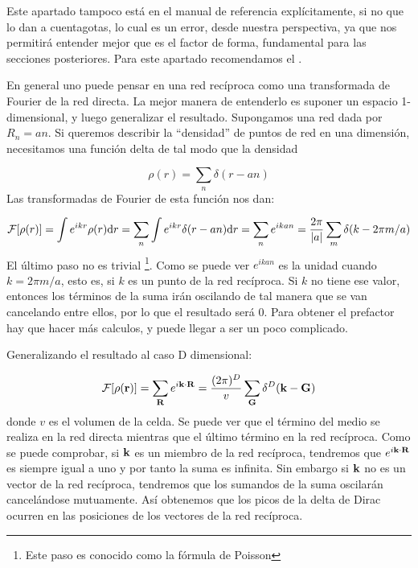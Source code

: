 Este apartado tampoco está en el manual de referencia \cite{Fisica_del_Estado_Solido} explícitamente, si no que lo dan a cuentagotas, lo cual es un error, desde nuestra perspectiva, ya que nos permitirá entender mejor que es el factor de forma, fundamental para las secciones posteriores. Para este apartado recomendamos el \cite{Oxford_Solid_State}.

En general uno puede pensar en una red recíproca como una transformada de Fourier de la red directa. La mejor manera de entenderlo es suponer un espacio 1-dimensional, y luego generalizar el resultado. Supongamos una red dada por $R_n=an$. Si queremos describir la ``densidad'' de puntos de red en una dimensión, necesitamos una función delta de tal modo que la densidad

\begin{equation}
	\rho (r) = \sum_n \delta (r-an) 
\end{equation}
Las transformadas de Fourier de esta función nos dan:

\begin{equation}
	\mathcal{F} [\rho(r)] = \int e^{ikr} \rho (r) \mathrm{d} r =  \sum_{n} \int e^{ikr} \delta (r-an) \mathrm{d} r =  \sum_n e^{ikan} = \frac{2\pi}{|a|} \sum_m \delta (k - 2\pi m/a)
\end{equation}
El último paso no es trivial \footnote{Este paso es conocido como la fórmula de Poisson}. Como se puede ver $e^{ikan}$ es la unidad cuando $k=2\pi m/a$, esto es, si $k$ es un punto de la red recíproca. Si $k$ no tiene ese valor, entonces los términos de la suma irán oscilando de tal manera que se van cancelando entre ellos, por lo que el resultado será 0. Para obtener el prefactor hay que hacer más calculos, y puede llegar a ser un poco complicado.

Generalizando el resultado al caso D dimensional:

\begin{equation}
	\mathcal{F} [\rho(\mathbf{r})] = \sum_{\mathbf{R}} e^{i\mathbf{k} \cdot \mathbf{R}} = \frac{(2\pi)^D}{v} \sum_{\mathbf{G}} \delta^D (\mathbf{k}-\mathbf{G}) \label{Ec:02-01-07}
\end{equation}
donde $v$ es el volumen de la celda. Se puede ver que el término del medio se realiza en la red directa mientras que el último término en la red recíproca. Como se puede comprobar, si $\mathbf{k}$ es un miembro de la red recíproca, tendremos que $e^{i \mathbf{k} \cdot \mathbf{R}}$ es siempre igual a uno y por tanto la suma es infinita. Sin embargo si $\mathbf{k}$ no es un vector de la red recíproca, tendremos que los sumandos de la suma oscilarán cancelándose mutuamente. Así obtenemos que los picos de la delta de Dirac ocurren en las posiciones de los vectores de la red recíproca.

